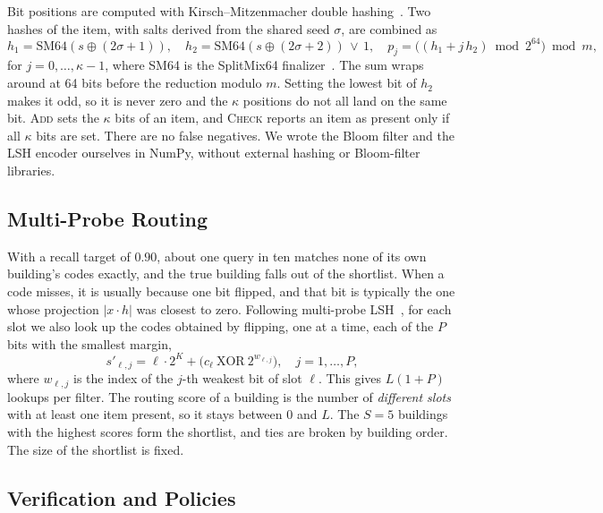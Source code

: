 \documentclass[runningheads]{llncs}
\begin{document}
Bit positions are computed with Kirsch--Mitzenmacher double hashing~\cite{kirsch2006}. Two hashes of the item, with
salts derived from the shared seed $\sigma$, are combined as
\begin{equation}
  h_1=\text{SM64}(s\oplus(2\sigma+1)),\quad h_2=\text{SM64}(s\oplus(2\sigma+2))\,\vee\,1,\quad
  p_j=\bigl((h_1+j\,h_2)\bmod 2^{64}\bigr)\bmod m,
\end{equation}
for $j=0,\dots,\kappa-1$, where SM64 is the SplitMix64 finalizer~\cite{steele2014}. The sum wraps around at 64 bits
before the reduction modulo $m$. Setting the lowest bit of $h_2$ makes it odd, so it is never zero and the $\kappa$
positions do not all land on the same bit. \textsc{Add} sets the $\kappa$ bits of an item, and \textsc{Check}
reports an item as present only if all $\kappa$ bits are set. There are no false negatives. We wrote the Bloom
filter and the LSH encoder ourselves in NumPy, without external hashing or Bloom-filter libraries.

\subsection{Multi-Probe Routing}
\label{sec:probe}

With a recall target of $0.90$, about one query in ten matches none of its own building's codes exactly, and the true
building falls out of the shortlist. When a code misses, it is usually because one bit flipped, and that bit is
typically the one whose projection $|x\cdot h|$ was closest to zero. Following multi-probe LSH~\cite{lv2007}, for
each slot we also look up the codes obtained by flipping, one at a time, each of the $P$ bits with the smallest
margin,
\begin{equation}
  s'_{\ell,j}=\ell\cdot2^{K}+\bigl(c_\ell\ \text{XOR}\ 2^{w_{\ell,j}}\bigr),\quad j=1,\dots,P,
\end{equation}
where $w_{\ell,j}$ is the index of the $j$-th weakest bit of slot $\ell$. This gives $L(1+P)$ lookups per filter.
The routing score of a building is the number of \emph{different slots} with at least one item present, so it stays
between 0 and $L$. The $S=5$ buildings with the highest scores form the shortlist, and ties are broken by building
order. The size of the shortlist is fixed.

\subsection{Verification and Policies}
\label{sec:vote}
\end{document}
